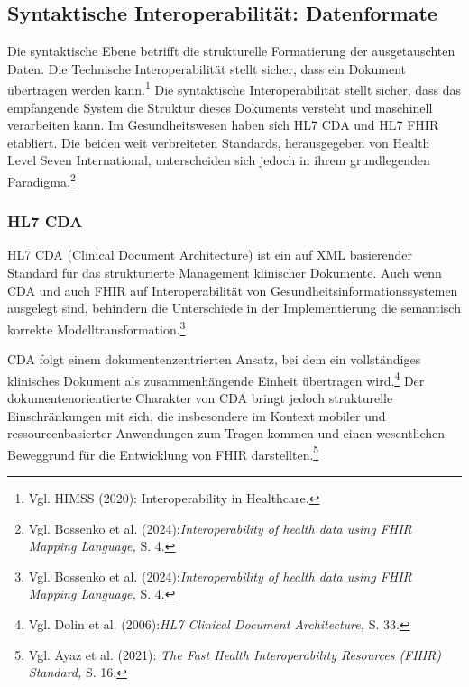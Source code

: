     \subsection{Syntaktische Interoperabilität: Datenformate}
Die syntaktische Ebene betrifft die strukturelle Formatierung der ausgetauschten Daten. Die Technische Interoperabilität stellt sicher, dass ein Dokument übertragen werden kann.\footnote{Vgl. HIMSS (2020): Interoperability in Healthcare.} Die syntaktische Interoperabilität stellt sicher, dass das empfangende System die Struktur dieses Dokuments versteht und maschinell verarbeiten kann. Im Gesundheitswesen haben sich HL7 CDA und HL7 FHIR etabliert. Die beiden weit verbreiteten Standards, herausgegeben von Health Level Seven International, unterscheiden sich jedoch in ihrem grundlegenden Paradigma.\footnote{Vgl. Bossenko et al. (2024):\textit{Interoperability of health data using FHIR Mapping Language,} S. 4.}

        \subsubsection{HL7 CDA}
HL7 CDA (Clinical Document Architecture) ist ein auf XML basierender Standard für das strukturierte Management klinischer Dokumente. Auch wenn CDA und auch FHIR auf Interoperabilität von Gesundheitsinformationssystemen ausgelegt sind, behindern die Unterschiede in der Implementierung die semantisch korrekte Modelltransformation.\footnote{Vgl. Bossenko et al. (2024):\textit{Interoperability of health data using FHIR Mapping Language,} S. 4.}

CDA folgt einem dokumentenzentrierten Ansatz, bei dem ein vollständiges klinisches Dokument als zusammenhängende Einheit übertragen wird.\footnote{Vgl. Dolin et al. (2006):\textit{HL7 Clinical Document Architecture,} S. 33.} Der dokumentenorientierte Charakter von CDA bringt jedoch strukturelle Einschränkungen mit sich, die insbesondere im Kontext mobiler und ressourcenbasierter Anwendungen zum Tragen kommen und einen wesentlichen Beweggrund für die Entwicklung von FHIR darstellten.\footnote{Vgl. Ayaz et al. (2021): \textit{The Fast Health Interoperability Resources (FHIR) Standard,} S. 16.}

